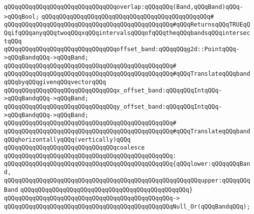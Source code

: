 \verb|qQQqqQQqqQQqqQQqqQQqqQQqqQQqqQQqoverlap:qQQqqQQq(Band,qQQqBand)qQQq->qQQqBool;|\newline
\verb|qQQqqQQqqQQqqQQqqQQqqQQqqQQqqQQqqQQqqQQqqQQqqQQq#|\newline
\verb|qQQqqQQqqQQqqQQqqQQqqQQqqQQqqQQqqQQqqQQqqQQqqQQq#qQQqReturnsqQQqTRUEqQQqifqQQqanyqQQqtwoqQQqxqQQqintervalsqQQqofqQQqtheqQQqbandsqQQqintersectqQQq|\newline
\newline
\newline
\newline
\verb|qQQqqQQqqQQqqQQqqQQqqQQqqQQqqQQqoffset_band:qQQqqQQqg2d::PointqQQq->qQQqBandqQQq->qQQqBand;|\newline
\verb|qQQqqQQqqQQqqQQqqQQqqQQqqQQqqQQqqQQqqQQqqQQqqQQq#|\newline
\verb|qQQqqQQqqQQqqQQqqQQqqQQqqQQqqQQqqQQqqQQqqQQqqQQq#qQQqTranslateqQQqbandqQQqbyqQQqgivenqQQqvectorqQQq|\newline
\newline
\newline
\newline
\verb|qQQqqQQqqQQqqQQqqQQqqQQqqQQqqQQqx_offset_band:qQQqqQQqIntqQQq->qQQqBandqQQq->qQQqBand;|\newline
\verb|qQQqqQQqqQQqqQQqqQQqqQQqqQQqqQQqy_offset_band:qQQqqQQqIntqQQq->qQQqBandqQQq->qQQqBand;|\newline
\verb|qQQqqQQqqQQqqQQqqQQqqQQqqQQqqQQqqQQqqQQqqQQqqQQq#|\newline
\verb|qQQqqQQqqQQqqQQqqQQqqQQqqQQqqQQqqQQqqQQqqQQqqQQq#qQQqTranslateqQQqbandqQQqhorizontallyqQQq(vertically)qQQq|\newline
\newline
\newline
\newline
\verb|qQQqqQQqqQQqqQQqqQQqqQQqqQQqqQQqcoalesce|\newline
\verb|qQQqqQQqqQQqqQQqqQQqqQQqqQQqqQQqqQQqqQQqqQQqqQQq:|\newline
\verb|qQQqqQQqqQQqqQQqqQQqqQQqqQQqqQQqqQQqqQQqqQQqqQQq{qQQqlower:qQQqqQQqBand,|\newline
\verb|qQQqqQQqqQQqqQQqqQQqqQQqqQQqqQQqqQQqqQQqqQQqqQQqqQQqqQQqupper:qQQqqQQqBand|\newline
\verb|qQQqqQQqqQQqqQQqqQQqqQQqqQQqqQQqqQQqqQQqqQQqqQQq}|\newline
\verb|qQQqqQQqqQQqqQQqqQQqqQQqqQQqqQQqqQQqqQQqqQQqqQQq->|\newline
\verb|qQQqqQQqqQQqqQQqqQQqqQQqqQQqqQQqqQQqqQQqqQQqqQQqNull_Or(qQQqBandqQQq);|\newline
